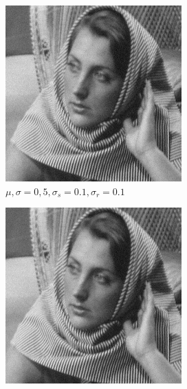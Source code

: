 \documentclass[a4paper, landscape]{article}
\begin{document}
\begin{figure}
    \centering
    \begin{subfigure}{0.33\linewidth}
        \centering
        \includegraphics[width=\linewidth]{barbara256,σ_noise5,σ_spatial0.1,σ_range0.1.png}
        \caption{$\mu, \sigma = 0, 5, \sigma_s=0.1, \sigma_r=0.1$}
    \end{subfigure}
    \begin{subfigure}{0.33\linewidth}
        \centering
        \includegraphics[width=\linewidth]{barbara256,σ_noise5,σ_spatial2,σ_range2.png}

\end{subfigure}
\end{figure}
\end{document}
